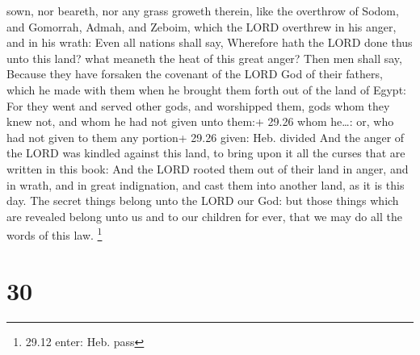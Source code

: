 sown, nor beareth, nor any grass groweth therein, like the overthrow of
Sodom, and Gomorrah, Admah, and Zeboim, which the LORD overthrew in his
anger, and in his wrath:  Even all nations shall say,
Wherefore hath the LORD done thus unto this land? what meaneth the heat
of this great anger?  Then men shall say, Because they have
forsaken the covenant of the LORD God of their fathers, which he made
with them when he brought them forth out of the land of Egypt:
 For they went and served other gods, and worshipped them,
gods whom they knew not, and whom he had not given unto them:+ 29.26
whom he\ldots: or, who had not given to them any portion+ 29.26 given:
Heb. divided  And the anger of the LORD was kindled against
this land, to bring upon it all the curses that are written in this
book:  And the LORD rooted them out of their land in anger,
and in wrath, and in great indignation, and cast them into another land,
as it is this day.  The secret things belong unto the LORD
our God: but those things which are revealed belong unto us and to our
children for ever, that we may do all the words of this law. \footnote{29.12
  enter: Heb. pass}

\hypertarget{section-29}{%
\section{30}\label{section-29}}

